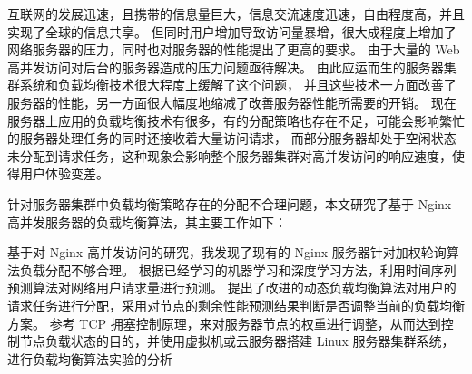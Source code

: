 \begin{cabstract}

互联网的发展迅速，且携带的信息量巨大，信息交流速度迅速，自由程度高，并且实现了全球的信息共享。
但同时用户增加导致访问量暴增，很大成程度上增加了网络服务器的压力，同时也对服务器的性能提出了更高的要求。
由于大量的 Web 高并发访问对后台的服务器造成的压力问题亟待解决。
由此应运而生的服务器集群系统和负载均衡技术很大程度上缓解了这个问题，
并且这些技术一方面改善了服务器的性能，另一方面很大幅度地缩减了改善服务器性能所需要的开销。
现在服务器上应用的负载均衡技术有很多，有的分配策略也存在不足，可能会影响繁忙的服务器处理任务的同时还接收着大量访问请求，
而部分服务器却处于空闲状态未分配到请求任务，这种现象会影响整个服务器集群对高并发访问的响应速度，使得用户体验变差。

针对服务器集群中负载均衡策略存在的分配不合理问题，本文研究了基于 Nginx 高并发服务器的负载均衡算法，其主要工作如下：

基于对 Nginx 高并发访问的研究，我发现了现有的 Nginx 服务器针对加权轮询算法负载分配不够合理。
根据已经学习的机器学习和深度学习方法，利用时间序列预测算法对网络用户请求量进行预测。
提出了改进的动态负载均衡算法对用户的请求任务进行分配，采用对节点的剩余性能预测结果判断是否调整当前的负载均衡方案。
参考 TCP 拥塞控制原理，来对服务器节点的权重进行调整，从而达到控制节点负载状态的目的，并使用虚拟机或云服务器搭建 Linux 服务器集群系统，进行负载均衡算法实验的分析

\end{cabstract}


